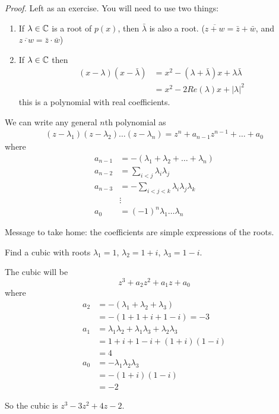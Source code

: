 \documentclass[10pt]{scrartcl}
\begin{document}
\emph{Proof.} Left as an exercise. You will need to use two things: 
\begin{enumerate}
\item If $\lambda \in\mathbb{C}$ is a root of $p(x)$, then $\bar{\lambda}$ is also a root. ($\overline{z+ w} = \bar{z} + \bar{w}$, and $\overline{z \cdot w} = \bar{z} \cdot \bar{w}$)

\item If $\lambda \in\mathbb{C}$ then 
\[
\begin{aligned}
  (x-\lambda)(x-\bar{\lambda}) &= x^2 - (\lambda + \bar{\lambda})x + \lambda\bar{\lambda}\\
  &= x^2 - 2Re(\lambda)x + |\lambda|^2
\end{aligned}
\]
this is a polynomial with real coefficients. \\
\end{enumerate}


We can write any general $n$th polynomial as
\[
\begin{aligned}
  (z-\lambda_1)(z-\lambda_2)\dots(z-\lambda_n) = z^n + a_{n-1}z^{n-1} + \dots + a_0
\end{aligned}
\]
where 
\[
\begin{aligned}
  a_{n-1} &= -(\lambda_1 + \lambda_2 + \dots + \lambda_n)\\
  a_{n-2} &= \sum_{i < j} \lambda_i\lambda_j\\
  a_{n-3} &= -\sum_{i < j< k} \lambda_i \lambda_j \lambda_k\\
  &\vdots \\
  a_0 &= (-1)^n \lambda_1\dots \lambda_n
\end{aligned}
\]

Message to take home: the coefficients are simple expressions of the roots.\\

\begin{example}
Find a cubic with roots $\lambda_1 = 1$, $\lambda_2 = 1 + i$, $\lambda_3 = 1-i$.

The cubic will be 
\[z^3 + a_2 z^2 + a_1z + a_0\]
where 
\[
\begin{aligned}
    a_2 &= -(\lambda_1 + \lambda_2 + \lambda_3)\\
  &= -(1+ 1 + i + 1 -i) = -3\\[0.3cm]
    a_1 &= \lambda_1\lambda_2 + \lambda_1\lambda_3 + \lambda_2\lambda_3\\
  &= 1 + i + 1 - i + (1+i)(1-i)\\
  &= 4\\[0.3cm]
  a_0 &= -\lambda_1\lambda_2\lambda_3 \\
  &= -(1 + i)(1-i)\\
  &= -2
\end{aligned}
\]

So the cubic is $z^3 -3z^2 + 4z - 2$. 
\end{example}\vspace*{10pt}
\end{document}
